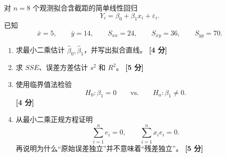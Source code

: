\documentclass[11pt,a4paper]{article}
\newcommand{\pts}[1]{\hfill\textbf{[#1 分]}}
\begin{document}
\begin{questionbox}
对 $n=8$ 个观测拟合含截距的简单线性回归
\[
  Y_i=\beta_0+\beta_1x_i+\varepsilon_i.
\]
已知
\[
  \bar x=5,\qquad
  \bar y=14,\qquad
  S_{xx}=24,\qquad
  S_{xy}=36,\qquad
  S_{yy}=70.
\]

\begin{enumerate}
  \item 求最小二乘估计 $\hat\beta_0,\hat\beta_1$，并写出拟合直线。 \pts{4}
  \item 求 $SSE$、误差方差估计 $s^2$ 和 $R^2$。 \pts{5}
  \item 使用临界值法检验
  \[
    H_0:\beta_1=0
    \qquad\text{vs.}\qquad
    H_a:\beta_1\ne0.
  \]
  \pts{4}
  \item 从最小二乘正规方程证明
  \[
    \sum_{i=1}^n e_i=0,
    \qquad
    \sum_{i=1}^n x_ie_i=0.
  \]
  再说明为什么“原始误差独立”并不意味着“残差独立”。 \pts{5}
\end{enumerate}
\end{questionbox}
\end{document}

